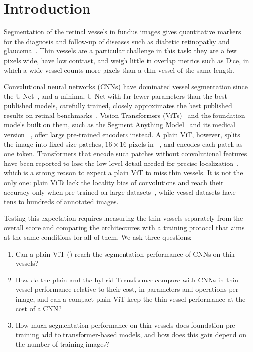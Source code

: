 \section{Introduction}
\label{sec:introduction}

Segmentation of the retinal vessels in fundus images gives quantitative markers for the diagnosis and follow-up of diseases such as diabetic retinopathy and glaucoma~\cite{jin2022fives, moccia2018blood}. Thin vessels are a particular challenge in this task: they are a few pixels wide, have low contrast, and weigh little in overlap metrics such as Dice, in which a wide vessel counts more pixels than a thin vessel of the same length.

Convolutional neural networks (CNNs) have dominated vessel segmentation since the U-Net~\cite{ronneberger2015u, siddique2021u}, and a minimal U-Net with far fewer parameters than the best published models, carefully trained, closely approximates the best published results on retinal benchmarks~\cite{galdran2020littlewnetcouldstateoftheart}. Vision Transformers (ViTs)~\cite{dosovitskiy2020image} and the foundation models built on them, such as the Segment Anything Model~\cite{Kirillov_2023_ICCV} and its medical version \medsam{}~\cite{ma2024segment}, offer large pre-trained encoders instead. A plain ViT, however, splits the image into fixed-size patches, $16 \times 16$ pixels in \medsam{}~\cite{ma2024segment}, and encodes each patch as one token. Transformers that encode such patches without convolutional features have been reported to lose the low-level detail needed for precise localization~\cite{chen2021transunet}, which is a strong reason to expect a plain ViT to miss thin vessels. It is not the only one: plain ViTs lack the locality bias of convolutions and reach their accuracy only when pre-trained on large datasets~\cite{dosovitskiy2020image}, while vessel datasets have tens to hundreds of annotated images.

Testing this expectation requires measuring the thin vessels separately from the overall score and comparing the architectures with a training protocol that aims at the same conditions for all of them. We ask three questions:
\begin{enumerate}
    \item Can a plain ViT (\medsam{}) reach the segmentation performance of CNNs on thin vessels?
    \item How do the plain and the hybrid Transformer compare with CNNs in thin-vessel performance relative to their cost, in parameters and operations per image, and can a compact plain ViT keep the thin-vessel performance at the cost of a CNN?
    \item How much segmentation performance on thin vessels does foundation pre-training add to transformer-based models, and how does this gain depend on the number of training images?
\end{enumerate}

